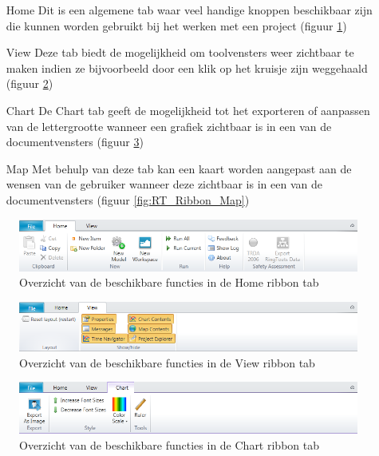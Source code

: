 \begin{itemize}
	\item[Home] Dit is een algemene tab waar veel handige knoppen beschikbaar zijn die kunnen worden gebruikt bij het werken met een project (figuur \ref{fig:rt_Ribbon_Home})
	\item[View] Deze tab biedt de mogelijkheid om toolvensters weer zichtbaar te maken indien ze bijvoorbeeld door een klik op het kruisje zijn weggehaald (figuur \ref{fig:RT_Ribbon_View})
	\item[Chart] De Chart tab geeft de mogelijkheid tot het exporteren of aanpassen van de lettergrootte wanneer een grafiek zichtbaar is in een van de documentvensters (figuur \ref{fig:rt_Ribbon_Chart})
	\item[Map] Met behulp van deze tab kan een kaart worden aangepast aan de wensen van de gebruiker wanneer deze zichtbaar is in een van de documentvensters (figuur \ref{fig:RT_Ribbon_Map})
\end{itemize}

\begin{figure}[H]
	\centering
		\includegraphics[width=1.0\textwidth]{figures/chapter_general/rt_Home.png}
		\caption{Overzicht van de beschikbare functies in de Home ribbon tab}
	\label{fig:rt_Ribbon_Home}
\end{figure}

\begin{figure}[H]
	\centering
		\includegraphics[width=1.0\textwidth]{figures/chapter_general/rt_View.png}
		\caption{Overzicht van de beschikbare functies in de View ribbon tab}
	\label{fig:RT_Ribbon_View}
\end{figure}

\begin{figure}[H]
	\centering
		\includegraphics[width=1.0\textwidth]{figures/chapter_general/rt_Chart.png}
		\caption{Overzicht van de beschikbare functies in de Chart ribbon tab}
	\label{fig:rt_Ribbon_Chart}
\end{figure}

